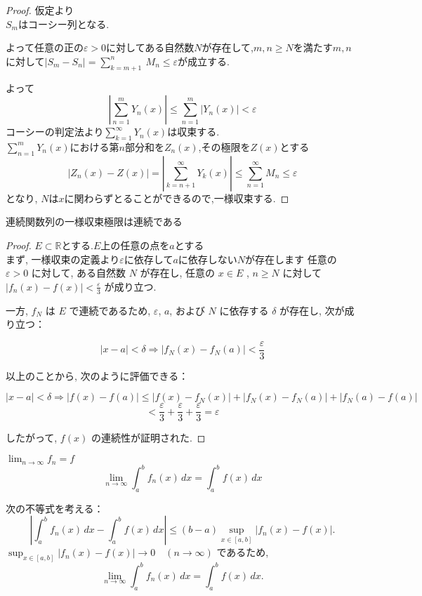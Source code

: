 \documentclass[12pt,xelatex,ja=standard]{bxjsarticle}
\begin{document}
\begin{proof}
    
仮定より\\
$S_{m}$はコーシー列となる.

よって任意の正の$\varepsilon >0$に対してある自然数$N$が存在して,$m,n \geq N$を満たす$m,n$に対して$\left|S_{m}-S_{n}\right|= \displaystyle\sum_{k=m+1}^{n}\ M_{n} \leq \varepsilon $が成立する.

よって
\[\left|\displaystyle\sum_{n=1}^m Y_{n}(x)\right| \leq \sum_{n=1}^{m} \left|Y_{n}(x)\right| < \varepsilon\]
コーシーの判定法より$\displaystyle\sum_{k=1}^\infty Y_{n}(x)$は収束する.\\
$\displaystyle\sum_{n=1}^m Y_{n}(x)$における第$n$部分和を$Z_{n}(x)$,その極限を$Z(x)$とする\\
\[\left|Z_{n}(x)-Z(x)\right|=\left|\displaystyle\sum_{k=n+1}^\infty Y_{k}(x)\right| \leq \displaystyle\sum_{n=1}^\infty M_{n} \leq \varepsilon\]
となり, $N$は$x$に関わらずとることができるので,一様収束する.
\end{proof}
\begin{Lemma}
連続関数列の一様収束極限は連続である
\end{Lemma}
\begin{proof}
$E\subset \mathbb{R}$とする.$E$上の任意の点を$a$とする\\
まず, 一様収束の定義より$\varepsilon$に依存して$a$に依存しない$N$が存在します
任意の $\varepsilon > 0$ に対して, ある自然数 $N$ が存在し, 任意の $x \in E$ , $n \geq N$ に対して $\left| f_n(x) - f(x) \right| < \frac{\varepsilon}{3}$ が成り立つ.

一方, $f_N$ は $E$ で連続であるため, $\varepsilon$, $a$, および $N$ に依存する $\delta$ が存在し, 次が成り立つ：

\[
\left| x - a \right| < \delta \Rightarrow \left| f_N(x) - f_N(a) \right| < \frac{\varepsilon}{3}
\]

以上のことから, 次のように評価できる：

\[
\left| x - a \right| < \delta \Rightarrow \left| f(x) - f(a) \right| \leq \left| f(x) - f_N(x) \right| + \left| f_N(x) - f_N(a) \right| + \left| f_N(a) - f(a) \right|
\]
\[
< \frac{\varepsilon}{3} + \frac{\varepsilon}{3} + \frac{\varepsilon}{3} = \varepsilon
\]

したがって, $f(x)$ の連続性が証明された.
\end{proof}
\begin{Lemma}
$\lim_{n \to \infty} f_n = f$
\[\lim_{n \to \infty} \displaystyle \int_a^b f_n(x) \, dx = \displaystyle \int_a^b f(x) \, dx \]
\end{Lemma}
次の不等式を考える：
\[
\left| \int_a^b f_n(x) \, dx - \int_a^b f(x) \, dx \right| \leq (b-a) \sup_{x \in [a, b]} |f_n(x) - f(x)|.
\]
\(\sup_{x \in [a, b]} |f_n(x) - f(x)| \to 0 \quad (n \to \infty)\) であるため,
\[
\lim_{n \to \infty} \int_a^b f_n(x) \, dx = \int_a^b f(x) \, dx.
\]
\end{document}

